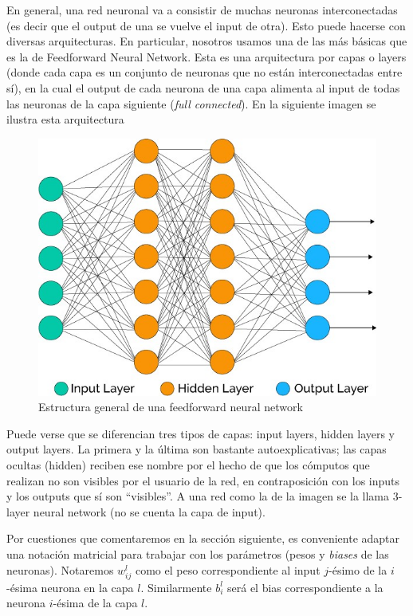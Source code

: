 En general, una red neuronal va a consistir de muchas neuronas interconectadas (es decir que el output de una se vuelve el input de otra). Esto puede hacerse con diversas arquitecturas. En particular, nosotros usamos una de las más básicas que es la de Feedforward Neural Network. Esta es una arquitectura por capas o layers (donde cada capa es un conjunto de neuronas que no están interconectadas entre sí), en la cual el output de cada neurona de una capa alimenta al input de todas las neuronas de la capa siguiente (\emph{full connected}). En la siguiente imagen se ilustra esta arquitectura

\begin{figure}[H]
  \begin{center}  
    \includegraphics[width=0.7\linewidth]{imgs/multilayer_net.jpg}
  \end{center}
  \caption{Estructura general de una feedforward neural network}
  \label{fig:general_net}
\end{figure}

Puede verse que se diferencian tres tipos de capas: input layers, hidden layers y output layers. La primera y la última son bastante autoexplicativas; las capas ocultas (hidden) reciben ese nombre por el hecho de que los cómputos que realizan no son visibles por el usuario de la red, en contraposición con los inputs y los outputs que sí son ``visibles''. A una red como la de la imagen se la llama 3-layer neural network (no se cuenta la capa de input).

Por cuestiones que comentaremos en la sección siguiente, es conveniente adaptar una notación matricial para trabajar con los parámetros (pesos y \emph{biases} de las neuronas). Notaremos $w^l_{ij}$ como el peso correspondiente al input $j$-ésimo de la $i$-ésima neurona en la capa $l$. Similarmente $b^l_i$ será el bias correspondiente a la neurona $i$-ésima de la capa $l$.

